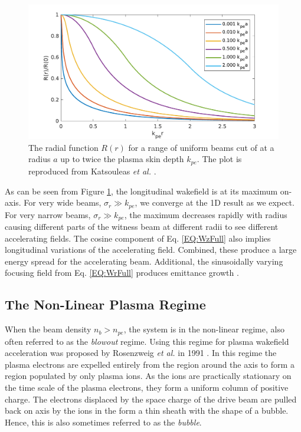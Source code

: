 \begin{figure}[hbt]
    \centering
    \includegraphics[width=0.70\linewidth,trim={0mm 0mm 0mm 0mm},clip]{figures/RepKatsouleas1987}
    \caption{\label{Fig:BPI:Kat87} The radial function $R(r)$ for a range of uniform beams cut of at a radius $a$ up to twice the plasma skin depth $k_{pe}$. The plot is reproduced from Katsouleas \textit{et al.} \cite{katsouleas:1987}.}
\end{figure}

As can be seen from Figure \ref{Fig:BPI:Kat87}, the longitudinal wakefield is at its maximum on-axis. For very wide beams, $\sigma_{r} \gg k_{pe}$, we converge at the 1D result as we expect. For very narrow beams, $\sigma_{r} \gg k_{pe}$, the maximum decreases rapidly with radius causing different parts of the witness beam at different radii to see different accelerating fields. The cosine component of Eq. \ref{EQ:WzFull} also implies longitudinal variations of the accelerating field. Combined, these produce a large energy spread for the accelerating beam. Additional, the sinusoidally varying focusing field from Eq. \ref{EQ:WrFull} produces emittance growth \cite{muggli:2017,katsouleas:1987}.

\subsection{The Non-Linear Plasma Regime}
\label{Int:BPI:NLin}

When the beam density $n_{b} > n_{pe}$, the system is in the non-linear regime, also often referred to as the \textit{blowout} regime. Using this regime for plasma wakefield acceleration was proposed by Rosenzweig \textit{et al.} in 1991 \cite{rosenzweig:1991}. In this regime the plasma electrons are expelled entirely from the region around the axis to form a region populated by only plasma ions. As the ions are practically stationary on the time scale of the plasma electrons, they form a uniform column of positive charge. The electrons displaced by the space charge of the drive beam are pulled back on axis by the ions in the form a thin sheath with the shape of a bubble. Hence, this is also sometimes referred to as the \textit{bubble}.

